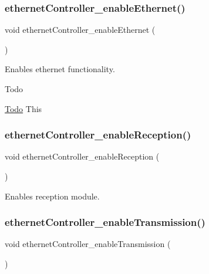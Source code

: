 \subsubsection{\texorpdfstring{ethernetController\_enableEthernet()}{ethernetController\_enableEthernet()}}
{\footnotesize\ttfamily void ethernet\+Controller\+\_\+enable\+Ethernet (\begin{DoxyParamCaption}{ }\end{DoxyParamCaption})}



Enables ethernet functionality. 

\begin{DoxyRefDesc}{Todo}
\item[\mbox{\hyperlink{todo__todo000005}{Todo}}]This \end{DoxyRefDesc}
\mbox{\label{group__init_ga203eb473ea1d221ffe97839b16e74565}} 
\subsubsection{\texorpdfstring{ethernetController\_enableReception()}{ethernetController\_enableReception()}}
{\footnotesize\ttfamily void ethernet\+Controller\+\_\+enable\+Reception (\begin{DoxyParamCaption}{ }\end{DoxyParamCaption})}



Enables reception module. 

\mbox{\label{group__init_ga0aef586bd9434125367071595a794806}} 
\subsubsection{\texorpdfstring{ethernetController\_enableTransmission()}{ethernetController\_enableTransmission()}}
{\footnotesize\ttfamily void ethernet\+Controller\+\_\+enable\+Transmission (\begin{DoxyParamCaption}{ }\end{DoxyParamCaption})}



